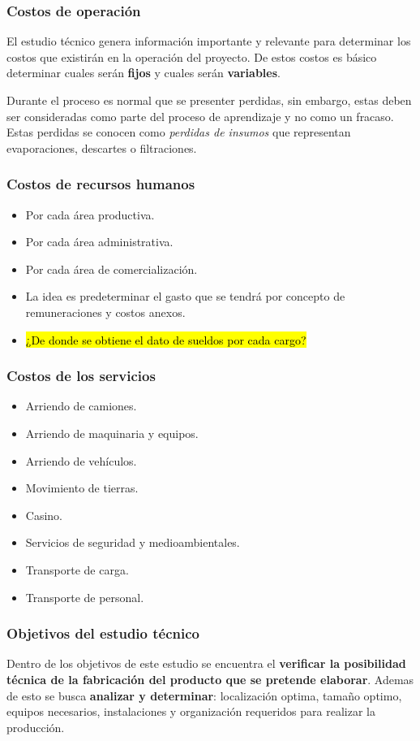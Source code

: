 \documentclass{templateNote}
\begin{document}
\subsubsection*{Costos de operación}
El estudio técnico genera información importante y relevante para determinar los costos que existirán en la operación del proyecto. De estos costos es básico determinar cuales serán \textbf{fijos} y cuales serán \textbf{variables}.

Durante el proceso es normal que se presenter perdidas, sin embargo, estas deben ser consideradas como parte del proceso de aprendizaje y no como un fracaso. Estas perdidas se conocen como \textit{perdidas de insumos} que representan evaporaciones, descartes o filtraciones.

\subsubsection*{Costos de recursos humanos}
\begin{itemize}
    \item Por cada área productiva.
    \item Por cada área administrativa.
    \item Por cada área de comercialización.
    \item La idea es predeterminar el gasto que se tendrá por concepto de remuneraciones y costos anexos.
    \item \hl{¿De donde se obtiene el dato de sueldos por cada cargo?} 
\end{itemize}
\subsubsection*{Costos de los servicios}
\begin{itemize}
    \item Arriendo de camiones.
    \item Arriendo de maquinaria y equipos.
    \item Arriendo de vehículos.
    \item Movimiento de tierras.
    \item Casino.
    \item Servicios de seguridad y medioambientales.
    \item Transporte de carga.
    \item Transporte de personal.
\end{itemize}

\subsubsection*{Objetivos del estudio técnico}
Dentro de los objetivos de este estudio se encuentra el \textbf{verificar la posibilidad técnica de la fabricación del producto que se pretende elaborar}. 
Ademas de esto se busca \textbf{analizar y determinar}: localización optima, tamaño optimo, equipos necesarios, instalaciones y organización requeridos para realizar la producción. 
\end{document}
